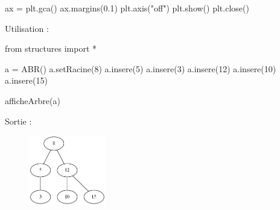 \documentclass[
  a4paper,
  DIV=11,
  numbers=noendperiod]{scrartcl}
\newenvironment{Shaded}{\begin{snugshade}}{\end{snugshade}}
\newcommand{\DecValTok}[1]{\textcolor[rgb]{0.68,0.00,0.00}{#1}}
\newcommand{\FloatTok}[1]{\textcolor[rgb]{0.68,0.00,0.00}{#1}}
\newcommand{\ImportTok}[1]{\textcolor[rgb]{0.00,0.46,0.62}{#1}}
\newcommand{\NormalTok}[1]{\textcolor[rgb]{0.00,0.23,0.31}{#1}}
\newcommand{\OperatorTok}[1]{\textcolor[rgb]{0.37,0.37,0.37}{#1}}
\newcommand{\StringTok}[1]{\textcolor[rgb]{0.13,0.47,0.30}{#1}}
\begin{document}
\begin{tcolorbox}
\begin{Shaded}
\begin{Highlighting}[]
\NormalTok{ax }\OperatorTok{=}\NormalTok{ plt.gca()}
\NormalTok{ax.margins(}\FloatTok{0.1}\NormalTok{)}
\NormalTok{plt.axis(}\StringTok{"off"}\NormalTok{)}
\NormalTok{plt.show()}
\NormalTok{plt.close()}
\end{Highlighting}
\end{Shaded}

Utilisation :

\begin{Shaded}
\begin{Highlighting}[]
\ImportTok{from}\NormalTok{ structures }\ImportTok{import} \OperatorTok{*}

\NormalTok{a }\OperatorTok{=}\NormalTok{ ABR()}
\NormalTok{a.setRacine(}\DecValTok{8}\NormalTok{)}
\NormalTok{a.insere(}\DecValTok{5}\NormalTok{)}
\NormalTok{a.insere(}\DecValTok{3}\NormalTok{)}
\NormalTok{a.insere(}\DecValTok{12}\NormalTok{)}
\NormalTok{a.insere(}\DecValTok{10}\NormalTok{)}
\NormalTok{a.insere(}\DecValTok{15}\NormalTok{)}

\NormalTok{afficheArbre(a)}
\end{Highlighting}
\end{Shaded}

Sortie :

\begin{figure}[H]

{\centering \includegraphics[width=0.3\textwidth,height=\textheight]{arbre.gv.png}

}

\end{figure}

\end{tcolorbox}
\end{document}

